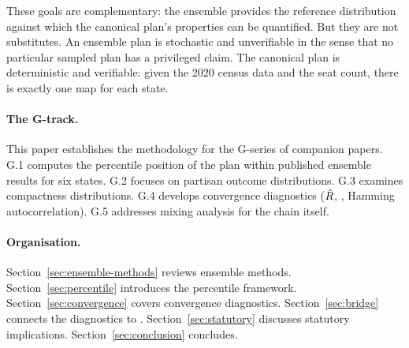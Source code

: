 These goals are complementary: the ensemble provides the reference distribution
against which the canonical plan's properties can be quantified.  But they
are not substitutes.  An ensemble plan is stochastic and unverifiable in the
sense that no particular sampled plan has a privileged claim.  The canonical
plan is deterministic and verifiable: given the 2020 census data and the
seat count, there is exactly one \ar{} map for each state.

\paragraph{The G-track.}
This paper establishes the methodology for the G-series of companion papers.
G.1 computes the percentile position of the \ar{} plan within published
ensemble results for six states.  G.2 focuses on partisan outcome distributions.
G.3 examines compactness distributions.  G.4 develops convergence diagnostics
($\hat{R}$, \ess{}, Hamming autocorrelation).  G.5 addresses mixing analysis
for the \recom{} chain itself.

\paragraph{Organisation.}
Section~\ref{sec:ensemble-methods} reviews ensemble methods.
Section~\ref{sec:percentile} introduces the percentile framework.
Section~\ref{sec:convergence} covers convergence diagnostics.
Section~\ref{sec:bridge} connects the diagnostics to \cs{}.
Section~\ref{sec:statutory} discusses statutory implications.
Section~\ref{sec:conclusion} concludes.
